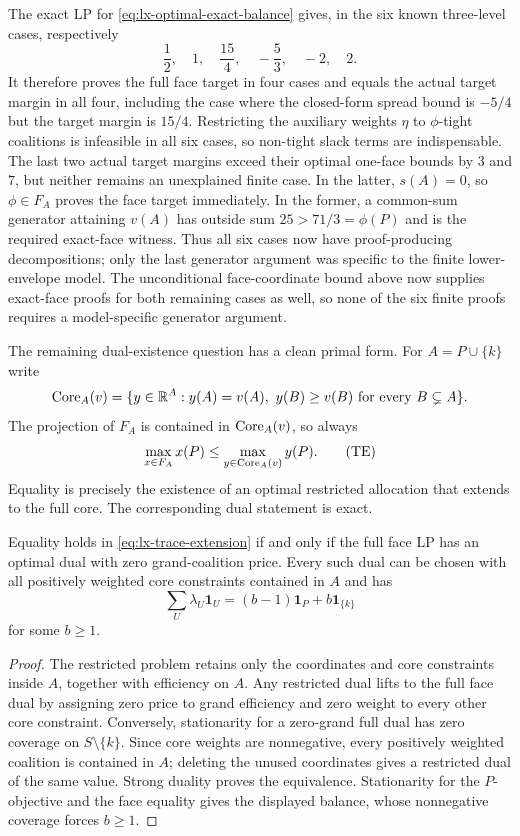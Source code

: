 The exact LP for \eqref{eq:lx-optimal-exact-balance} gives, in the six known
three-level cases, respectively
\[
 \frac12,\quad 1,\quad \frac{15}{4},\quad-\frac53,\quad-2,\quad 2.
\]
It therefore proves the full face target in four cases and equals the actual
target margin in all four, including the case where the closed-form spread
bound is $-5/4$ but the target margin is $15/4$.  Restricting the auxiliary
weights $\eta$ to $\phi$-tight coalitions is infeasible in all six cases, so
non-tight slack terms are indispensable.  The last two actual target margins
exceed their optimal one-face bounds by $3$ and $7$, but neither remains an
unexplained finite case.  In the latter, $s(A)=0$, so $\phi\in F_A$ proves the
face target immediately.  In the former, a common-sum generator attaining
$v(A)$ has outside sum $25>71/3=\phi(P)$ and is the required exact-face
witness.  Thus all six cases now have proof-producing decompositions; only
the last generator argument was specific to the finite lower-envelope model.
The unconditional face-coordinate bound above now supplies exact-face proofs
for both remaining cases as well, so none of the six finite proofs requires a
model-specific generator argument.

The remaining dual-existence question has a clean primal form.  For
$A=P\cup\{k\}$ write
\[
 \operatorname{Core}_A(v)=\{y\in\mathbb R^A:y(A)=v(A),\ y(B)\geq v(B)
                    \text{ for every }B\subsetneq A\}.
\]
The projection of $F_A$ is contained in $\operatorname{Core}_A(v)$, so always
\[
 \max_{x\in F_A}x(P)\leq\max_{y\in\operatorname{Core}_A(v)}y(P).       \tag{TE}
 \label{eq:lx-trace-extension}
\]
Equality is precisely the existence of an optimal restricted allocation that
extends to the full core.  The corresponding dual statement is exact.

\begin{lemma}
\label{lem:lx-trace-extension-dual}
Equality holds in \eqref{eq:lx-trace-extension} if and only if the full face
LP has an optimal dual with zero grand-coalition price.  Every such dual can
be chosen with all positively weighted core constraints contained in $A$ and
has
\[
 \sum_U\lambda_U\mathbf1_U
 =(b-1)\mathbf1_P+b\mathbf1_{\{k\}}
\]
for some $b\geq1$.
\end{lemma}

\begin{proof}
The restricted problem retains only the coordinates and core constraints
inside $A$, together with efficiency on $A$.  Any restricted dual lifts to
the full face dual by assigning zero price to grand efficiency and zero
weight to every other core constraint.  Conversely, stationarity for a
zero-grand full dual has zero coverage on $S\setminus\{k\}$.  Since core
weights are nonnegative, every positively weighted coalition is contained in
$A$; deleting the unused coordinates gives a restricted dual of the same
value.  Strong duality proves the equivalence.  Stationarity for the
$P$-objective and the face equality gives the displayed balance, whose
nonnegative coverage forces $b\geq1$.
\end{proof}

